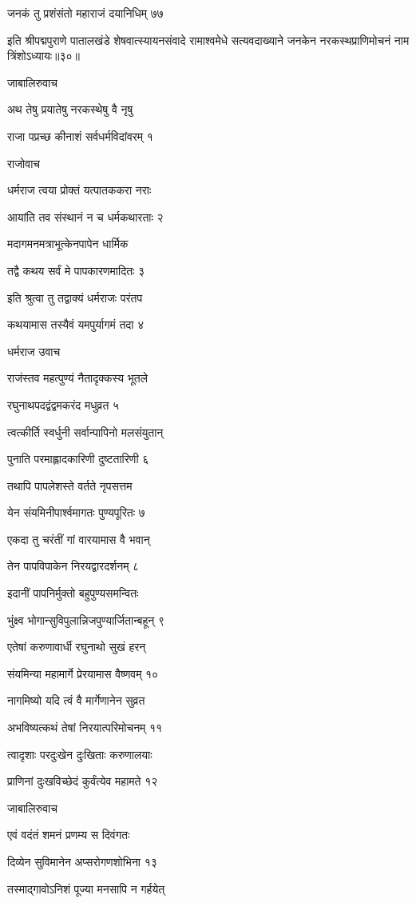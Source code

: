 जनकं तु प्रशंसंतो महाराजं दयानिधिम् ७७

इति श्रीपद्मपुराणे पातालखंडे शेषवात्स्यायनसंवादे रामाश्वमेधे सत्यवदाख्याने जनकेन नरकस्थप्राणिमोचनं नाम त्रिंशोऽध्यायः॥३०॥


जाबालिरुवाच

अथ तेषु प्रयातेषु नरकस्थेषु वै नृषु

राजा पप्रच्छ कीनाशं सर्वधर्मविदांवरम् १

राजोवाच

धर्मराज त्वया प्रोक्तं यत्पातककरा नराः

आयांति तव संस्थानं न च धर्मकथारताः २

मदागमनमत्राभूत्केनपापेन धार्मिक

तद्वै कथय सर्वं मे पापकारणमादितः ३

इति श्रुत्वा तु तद्वाक्यं धर्मराजः परंतप

कथयामास तस्यैवं यमपुर्यागमं तदा ४

धर्मराज उवाच

राजंस्तव महत्पुण्यं नैतादृक्कस्य भूतले

रघुनाथपदद्वंद्वमकरंद मधुव्रत ५

त्वत्कीर्ति स्वर्धुनी सर्वान्पापिनो मलसंयुतान्

पुनाति परमाह्लादकारिणी दुष्टतारिणी ६

तथापि पापलेशस्ते वर्तते नृपसत्तम

येन संयमिनीपार्श्वमागतः पुण्यपूरितः ७

एकदा तु चरंतीं गां वारयामास वै भवान्

तेन पापविपाकेन निरयद्वारदर्शनम् ८

इदानीं पापनिर्मुक्तो बहुपुण्यसमन्वितः

भुंक्ष्व भोगान्सुविपुलान्निजपुण्यार्जितान्बहून् ९

एतेषां करुणावार्धी रघुनाथो सुखं हरन्

संयमिन्या महामार्गे प्रेरयामास वैष्णवम् १०

नागमिष्यो यदि त्वं वै मार्गेणानेन सुव्रत

अभविष्यत्कथं तेषां निरयात्परिमोचनम् ११

त्वादृशाः परदुःखेन दुःखिताः करुणालयाः

प्राणिनां दुःखविच्छेदं कुर्वंत्येव महामते १२

जाबालिरुवाच

एवं वदंतं शमनं प्रणम्य स दिवंगतः

दिव्येन सुविमानेन अप्सरोगणशोभिना १३

तस्माद्गावोऽनिशं पूज्या मनसापि न गर्हयेत्

